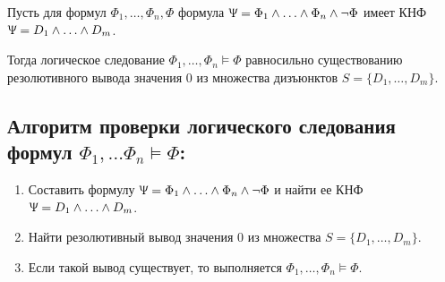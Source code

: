 \begin{corollary}
    Пусть для формул $\Phi_1,\ldots,\Phi_n,\Phi$ формула $\Uppsi=\Phi_1\land\ldots\land\Phi_n\land\lnot\Phi$ имеет КНФ \\ $\Uppsi=D_1\land\ldots\land D_m$.

    Тогда логическое следование $\Phi_1,\ldots,\Phi_n\models\Phi$ равносильно существованию резолютивного вывода значения 0 из множества дизъюнктов $S=\{D_1,\ldots,D_m\}$.
\end{corollary}

\subsection*{Алгоритм проверки логического следования формул $\Phi_1,\ldots\Phi_n\models\Phi$:}
\begin{enumerate}
    \item Составить формулу $\Uppsi=\Phi_1\land\ldots\land\Phi_n\land\lnot\Phi$ и найти ее КНФ \\ $\Uppsi=D_1\land\ldots\land D_m$.
    \item Найти резолютивный вывод значения 0 из множества $S = \{D_1,\ldots,D_m\}$.
    \item Если такой вывод существует, то выполняется $\Phi_1,\ldots,\Phi_n\models \Phi$.
\end{enumerate}

